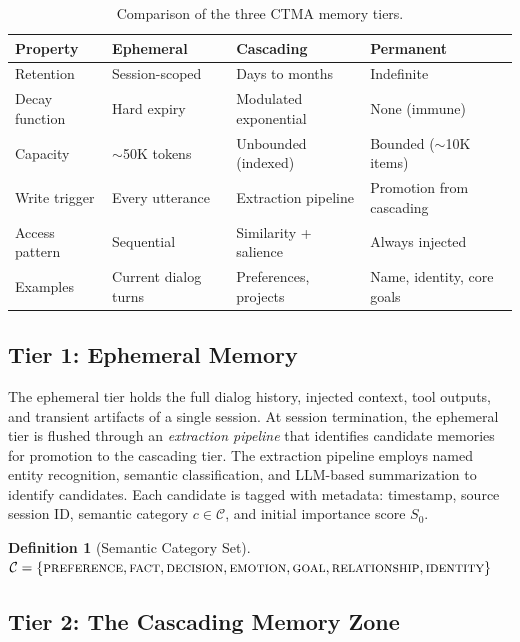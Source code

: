 \documentclass[11pt,a4paper]{article}
\newtheorem{definition}{Definition}
\begin{document}
\begin{table}[H]
\centering
\caption{Comparison of the three CTMA memory tiers.}
\label{tab:tiers}
\small
\begin{tabularx}{\textwidth}{lXXX}
\toprule
\textbf{Property} & \textbf{Ephemeral} & \textbf{Cascading} & \textbf{Permanent} \\
\midrule
Retention & Session-scoped & Days to months & Indefinite \\
Decay function & Hard expiry & Modulated exponential & None (immune) \\
Capacity & $\sim$50K tokens & Unbounded (indexed) & Bounded ($\sim$10K items) \\
Write trigger & Every utterance & Extraction pipeline & Promotion from cascading \\
Access pattern & Sequential & Similarity + salience & Always injected \\
Examples & Current dialog turns & Preferences, projects & Name, identity, core goals \\
\bottomrule
\end{tabularx}
\end{table}

\subsection{Tier 1: Ephemeral Memory}

The ephemeral tier holds the full dialog history, injected context, tool outputs, and transient artifacts of a single session. At session termination, the ephemeral tier is flushed through an \textit{extraction pipeline} that identifies candidate memories for promotion to the cascading tier. The extraction pipeline employs named entity recognition, semantic classification, and LLM-based summarization to identify candidates. Each candidate is tagged with metadata: timestamp, source session ID, semantic category $c \in \mathcal{C}$, and initial importance score $S_0$.

\begin{definition}[Semantic Category Set]
\label{def:categories}
$\mathcal{C} = \{\textsc{preference}, \textsc{fact}, \textsc{decision}, \textsc{emotion}, \textsc{goal}, \textsc{relationship}, \textsc{identity}\}$
\end{definition}

\subsection{Tier 2: The Cascading Memory Zone}
\end{document}
